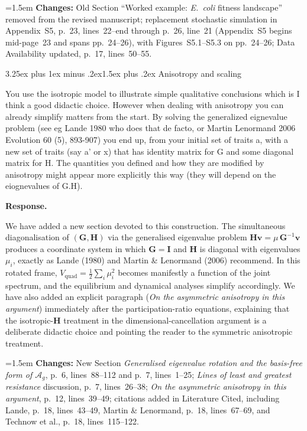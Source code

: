 \documentclass[11pt,a4paper]{article}
\makeatletter
\newcommand{\response}{%
  \par\medskip\noindent\textbf{\color{ResponseColor}Response.}\quad\ignorespaces
}
\newcommand{\changesat}[1]{%
  \par\smallskip\noindent\hangindent=1.5em\hangafter=1
  \textbf{\color{ChangeColor}Changes:} \quad #1\par\medskip
}
\renewcommand{\subsection}{\@startsection{subsection}{2}{0pt}%
  {3.25ex plus 1ex minus .2ex}{1.5ex plus .2ex}%
  {\large\bfseries}}
\newcommand{\Ag}{\ensuremath{\mathcal{A}_{g}}\xspace}
\newcommand{\Vquad}{\ensuremath{V_{\mathrm{quad}}}\xspace}
\newcommand{\mat}[1]{\ensuremath{\mathbf{#1}}}
\newcommand{\vect}[1]{\ensuremath{\bm{#1}}}
\makeatother
\begin{document}
\changesat{Old Section ``Worked example: \textit{E.~coli} fitness landscape'' removed from the revised manuscript; replacement stochastic simulation in Appendix~S5, p.~23, lines~22--end through p.~26, line~21 (Appendix~S5 begins mid-page~23 and spans pp.~24--26), with Figures~S5.1--S5.3 on pp.~24--26; Data Availability updated, p.~17, lines~50--55.}

\subsection{Anisotropy and scaling}

\begin{edquote}
You use the isotropic model to illustrate simple qualitative conclusions which is I think a good didactic choice. However when dealing with anisotropy you can already simplify matters from the start. By solving the generalized eignevalue problem (see eg Lande 1980 who does that de facto, or Martin Lenormand 2006 Evolution 60 (5), 893-907) you end up, from your initial set of traits a, with a new set of traits (say a' or x) that has identity matrix for G and some diagonal matrix for H. The quantities you defined and how they are modified by anisotropy might appear more explicitly this way (they will depend on the eiognevalues of G.H).
\end{edquote}

\response
We have added a new section devoted to this construction. The simultaneous diagonalisation of $(\mat{G}, \mat{H})$ via the generalised eigenvalue problem $\mat{H}\vect{v} = \mu\,\mat{G}^{-1}\vect{v}$ produces a coordinate system in which $\mat{G} = \mat{I}$ and $\mat{H}$ is diagonal with eigenvalues $\mu_i$, exactly as Lande (1980) and Martin \& Lenormand (2006) recommend. In this rotated frame, $\Vquad = \tfrac{1}{2}\sum_i \mu_i^2$ becomes manifestly a function of the joint spectrum, and the equilibrium and dynamical analyses simplify accordingly. We have also added an explicit paragraph (\textit{On the asymmetric anisotropy in this argument}) immediately after the participation-ratio equations, explaining that the isotropic-$\mat{H}$ treatment in the dimensional-cancellation argument is a deliberate didactic choice and pointing the reader to the symmetric anisotropic treatment.

\changesat{New Section \textit{Generalised eigenvalue rotation and the basis-free form of \Ag}, p.~6, lines~88--112 and p.~7, lines~1--25; \textit{Lines of least and greatest resistance} discussion, p.~7, lines~26--38; \textit{On the asymmetric anisotropy in this argument}, p.~12, lines~39--49; citations added in Literature Cited, including Lande, p.~18, lines~43--49, Martin \& Lenormand, p.~18, lines~67--69, and Technow et al., p.~18, lines~115--122.}
\end{document}
